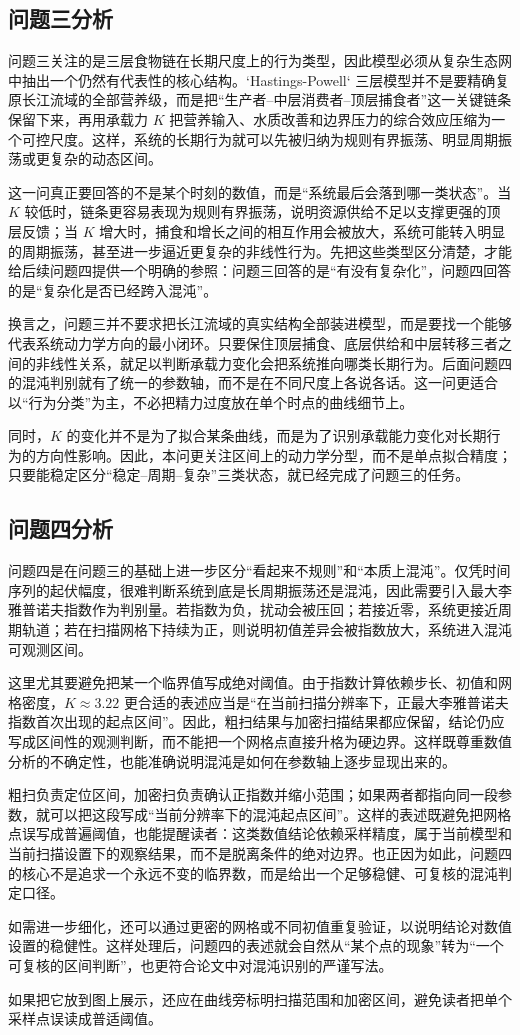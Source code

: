 \subsection{问题三分析}
问题三关注的是三层食物链在长期尺度上的行为类型，因此模型必须从复杂生态网中抽出一个仍然有代表性的核心结构。`Hastings-Powell` 三层模型并不是要精确复原长江流域的全部营养级，而是把“生产者--中层消费者--顶层捕食者”这一关键链条保留下来，再用承载力 \(K\) 把营养输入、水质改善和边界压力的综合效应压缩为一个可控尺度。这样，系统的长期行为就可以先被归纳为规则有界振荡、明显周期振荡或更复杂的动态区间。

这一问真正要回答的不是某个时刻的数值，而是“系统最后会落到哪一类状态”。当 \(K\) 较低时，链条更容易表现为规则有界振荡，说明资源供给不足以支撑更强的顶层反馈；当 \(K\) 增大时，捕食和增长之间的相互作用会被放大，系统可能转入明显的周期振荡，甚至进一步逼近更复杂的非线性行为。先把这些类型区分清楚，才能给后续问题四提供一个明确的参照：问题三回答的是“有没有复杂化”，问题四回答的是“复杂化是否已经跨入混沌”。

换言之，问题三并不要求把长江流域的真实结构全部装进模型，而是要找一个能够代表系统动力学方向的最小闭环。只要保住顶层捕食、底层供给和中层转移三者之间的非线性关系，就足以判断承载力变化会把系统推向哪类长期行为。后面问题四的混沌判别就有了统一的参数轴，而不是在不同尺度上各说各话。这一问更适合以“行为分类”为主，不必把精力过度放在单个时点的曲线细节上。

同时，\(K\) 的变化并不是为了拟合某条曲线，而是为了识别承载能力变化对长期行为的方向性影响。因此，本问更关注区间上的动力学分型，而不是单点拟合精度；只要能稳定区分“稳定--周期--复杂”三类状态，就已经完成了问题三的任务。

\subsection{问题四分析}
问题四是在问题三的基础上进一步区分“看起来不规则”和“本质上混沌”。仅凭时间序列的起伏幅度，很难判断系统到底是长周期振荡还是混沌，因此需要引入最大李雅普诺夫指数作为判别量。若指数为负，扰动会被压回；若接近零，系统更接近周期轨道；若在扫描网格下持续为正，则说明初值差异会被指数放大，系统进入混沌可观测区间。

这里尤其要避免把某一个临界值写成绝对阈值。由于指数计算依赖步长、初值和网格密度，\(K\approx 3.22\) 更合适的表述应当是“在当前扫描分辨率下，正最大李雅普诺夫指数首次出现的起点区间”。因此，粗扫结果与加密扫描结果都应保留，结论仍应写成区间性的观测判断，而不能把一个网格点直接升格为硬边界。这样既尊重数值分析的不确定性，也能准确说明混沌是如何在参数轴上逐步显现出来的。

粗扫负责定位区间，加密扫负责确认正指数并缩小范围；如果两者都指向同一段参数，就可以把这段写成“当前分辨率下的混沌起点区间”。这样的表述既避免把网格点误写成普遍阈值，也能提醒读者：这类数值结论依赖采样精度，属于当前模型和当前扫描设置下的观察结果，而不是脱离条件的绝对边界。也正因为如此，问题四的核心不是追求一个永远不变的临界数，而是给出一个足够稳健、可复核的混沌判定口径。

如需进一步细化，还可以通过更密的网格或不同初值重复验证，以说明结论对数值设置的稳健性。这样处理后，问题四的表述就会自然从“某个点的现象”转为“一个可复核的区间判断”，也更符合论文中对混沌识别的严谨写法。

如果把它放到图上展示，还应在曲线旁标明扫描范围和加密区间，避免读者把单个采样点误读成普适阈值。
